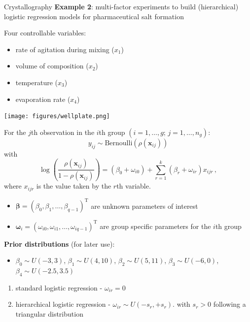 \documentclass[
  ignorenonframetext,
]{beamer}
\providecommand{\tightlist}{%
  \setlength{\itemsep}{0pt}\setlength{\parskip}{0pt}}
\begin{document}
\begin{frame}{Crystallography}
\protect\hypertarget{crystallography}{}
\textbf{Example 2}: multi-factor experiments to build (hierarchical)
logistic regression models for pharmaceutical salt formation

Four controllable variables:

\begin{itemize}
\tightlist
\item
  rate of agitation during mixing (\(x_1\))
\item
  volume of composition (\(x_2\))
\item
  temperature (\(x_3\))
\item
  evaporation rate (\(x_4\))
\end{itemize}

\texttt{[image: figures/wellplate.png]}
\end{frame}

\begin{frame}{}
\protect\hypertarget{section-22}{}
For the \(j\)th observation in the \(i\)th group
\((i=1,\ldots,g;\, j=1,\ldots,n_g)\): \[
y_{ij} \sim \mbox{Bernoulli}\left(\rho(\boldsymbol{x}_{ij})\right)
\] with \[
\log\left(\frac{\rho(\boldsymbol{x}_{ij})}{1-\rho(\boldsymbol{x}_{ij})}\right) = \left(\beta_0 + \omega_{i0}\right) + \sum_{r=1}^k\left(\beta_r + \omega_{ir}\right)x_{ijr}\,,
\] where \(x_{ijr}\) is the value taken by the \(r\)th variable.

\begin{itemize}
\tightlist
\item
  \(\boldsymbol{\beta}= (\beta_0,\beta_1,\ldots,\beta_{q-1})^\mathrm{T}\)
  are unknown parameters of interest
\item
  \(\boldsymbol{\omega}_i = (\omega_{i0}, \omega_{i1}, \ldots, \omega_{iq-1})^\mathrm{T}\)
  are group specific parameters for the \(i\)th group
\end{itemize}

\textbf{Prior distributions} (for later use):

\begin{itemize}
\tightlist
\item
  \(\beta_0 \sim U(-3,3)\), \(\beta_1 \sim U(4, 10)\),
  \(\beta_2 \sim U(5, 11)\), \(\beta_3 \sim U(-6, 0)\),
  \(\beta_4 \sim U(-2.5, 3.5)\)
\end{itemize}

\begin{enumerate}
\tightlist
\item
  standard logistic regression - \(\omega_{ir} = 0\)
\item
  hierarchical logistic regression - \(\omega_{ir} \sim U(-s_r, +s_r)\).
  with \(s_{r}>0\) following a triangular distribution
\end{enumerate}
\end{frame}
\end{document}
